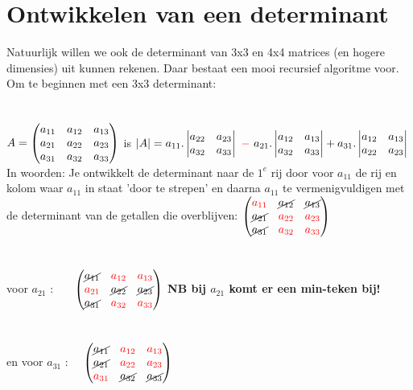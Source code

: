 \section{Ontwikkelen van een determinant}
Natuurlijk willen we ook de determinant van 3x3 en 4x4 matrices (en hogere dimensies) uit kunnen rekenen. Daar bestaat een mooi recursief algoritme voor. Om te beginnen met een 3x3 determinant:\\ \\ \\
{ $  A  = \begin{pmatrix}  a_{11} & a_{12} & a_{13}  \\  a_{21} & a_{22} & a_{23}  \\  a_{31} & a_{32}& a_{33}  \end{pmatrix}  $
	\quad is   \quad 
	$ |A|  = a_{11} .   \begin{vmatrix} a_{22} & a_{23} \\ a_{32}& a_{33}  \end{vmatrix} 
	\  {\color{red}-} \ a_{21} .   \begin{vmatrix} a_{12} & a_{13} \\ a_{32}& a_{33}  \end{vmatrix} 
	+a_{31} .   \begin{vmatrix} a_{12} & a_{13} \\  a_{22} & a_{23}  \end{vmatrix}  $ } \\
In woorden: Je ontwikkelt de determinant naar de $ 1^{e} $ rij door voor $  a_{11} $ de rij en kolom waar $  a_{11} $ in staat 'door te strepen' en daarna $  a_{11}  $ te vermenigvuldigen met de determinant van de getallen die overblijven:
$  \begin{pmatrix}   {\color{red}a_{11}} & \cancel{a_{12}} & \cancel{a_{13} }  \\  \cancel{a_{21}} & {\color{red}a_{22}} & {\color{red}a_{23}}  \\  \cancel{a_{31}} & {\color{red}a_{32}} & {\color{red}a_{33}}  \end{pmatrix}  $ \\ \\ \\
voor  $  a_{21}  $ :
\qquad \qquad \quad \ \ \ $  \begin{pmatrix}  \cancel{ a_{11}} & {\color{red}a_{12}} & {\color{red}a_{13 }}  \\ {\color{red}a_{21}} & \cancel{a_{22}} & \cancel{a_{23}}  \\  \cancel{a_{31}} & {\color{red}a_{32}}  & {\color{red}a_{33} } \end{pmatrix}   $
\quad \textbf{NB bij $  a_{21}  $ komt er een min-teken bij!}\\ \\ \\
en voor   $  a_{31} $  :
\qquad \qquad \  \ $   \begin{pmatrix}  \cancel{ a_{11}} & {\color{red}a_{12}} & {\color{red}a_{13}}   \\  \cancel{a_{21}} & {\color{red}a_{22}} & {\color{red}a_{23}}  \\  {\color{red}a_{31}} & \cancel{a_{32}} & \cancel{a_{33} }  \end{pmatrix}  $
\\ \\
